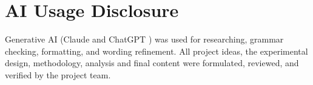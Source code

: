 \documentclass[12pt]{article}
\begin{document}
\newpage

\tableofcontents

\newpage

\listoffigures
\listoftables

\newpage

\clearpage{}














\section*{AI Usage Disclosure}

Generative AI (Claude and ChatGPT ) was used for  researching, grammar checking, formatting, and wording refinement. All project ideas, the experimental design, methodology, analysis and final content were formulated, reviewed, and verified by the project team.



\appendix

\end{document}
